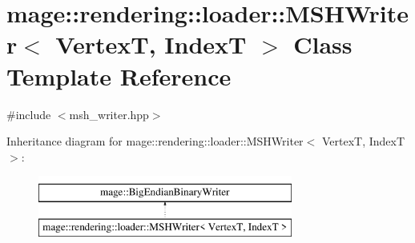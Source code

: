 \hypertarget{classmage_1_1rendering_1_1loader_1_1_m_s_h_writer}{}\section{mage\+:\+:rendering\+:\+:loader\+:\+:M\+S\+H\+Writer$<$ VertexT, IndexT $>$ Class Template Reference}
\label{classmage_1_1rendering_1_1loader_1_1_m_s_h_writer}


{\ttfamily \#include $<$msh\+\_\+writer.\+hpp$>$}

Inheritance diagram for mage\+:\+:rendering\+:\+:loader\+:\+:M\+S\+H\+Writer$<$ VertexT, IndexT $>$\+:\begin{figure}[H]
\begin{center}
\leavevmode
\includegraphics[height=2.000000cm]{classmage_1_1rendering_1_1loader_1_1_m_s_h_writer}
\end{center}
\end{figure}
